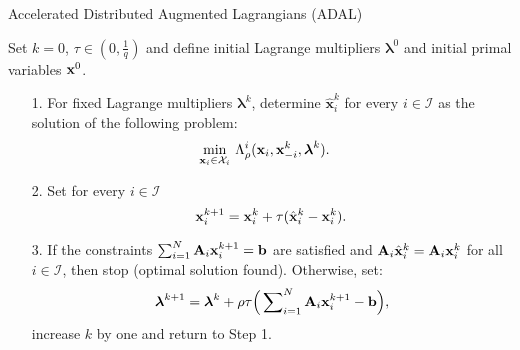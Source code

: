\documentclass[doublecolumn]{IEEEtran}
\begin{document}
\begin{algorithm}[t]\caption{Accelerated Distributed Augmented Lagrangians (ADAL)}\label{ADAL}
Set $k=0$, $\tau \in (0,\frac{1}{q})$ and define initial Lagrange multipliers ${\boldsymbol{\lambda}}^0$ and initial primal variables ${ {\bf x} }^0$.
\begin{enumerate}
\item[1.] For fixed Lagrange multipliers $\boldsymbol{\lambda}^k$, determine ${\hat{\mathbf x}}_i^k$ for every $i\in\mathcal{I}$ as the solution of the following problem:
\begin{equation}\label{ADAL_1}
\begin{aligned}
\min_{{ {\bf x} }_i \in \mathcal{X}_i}\, &\, \Lambda_{\rho}^i({ {\bf x} }_i,{ {\bf x} }_{-i}^k,{\boldsymbol{\lambda}}^k).
\end{aligned}
\end{equation}
\item[2.] Set for every $i\in\mathcal{I}$
\begin{equation}\label{ADAL_2}
{ {\bf x} }_i^{k+1} = { {\bf x} }_i^k + \tau ({\hat{\mathbf x}}_i^k -  { {\bf x} }_i^k ).
\end{equation}
\item[3.] If the constraints $\sum_{i=1}^{N}{\bf A}_i { {\bf x} }_i^{k+1} = { {\bf b} } $ are satisfied and ${ {\bf A} }_i\hat{ {\bf x} }_i^{k} = { {\bf A} }_i{ {\bf x} }_i^{k}$ for all $i\in\mathcal{I}$,
then stop (optimal solution found). Otherwise, set:
\begin{equation}\label{ADAL_3}
{\boldsymbol{\lambda}}^{k+1} = {\boldsymbol{\lambda}}^k + \rho\tau \Big(  \sum\nolimits_{i=1}^{N} {\bf A}_i { {\bf x} }^{k+1}_i - { {\bf b} }\Big),
\end{equation}
increase $k$ by one and return to Step 1.
\end{enumerate}
\end{algorithm}
\end{document}
